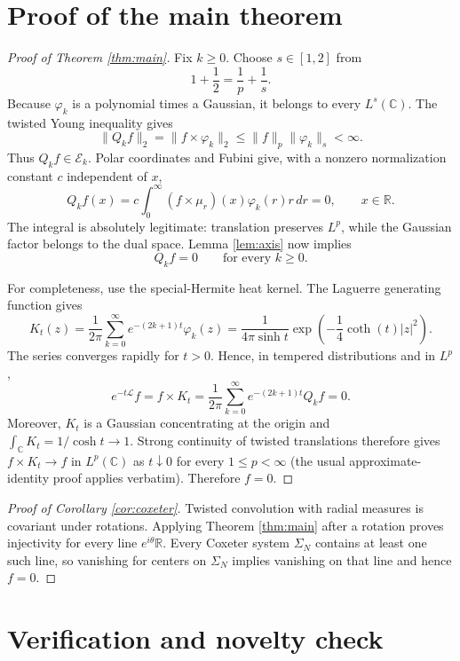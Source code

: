 \documentclass[11pt]{article}
\newcommand{\C}{\mathbb C}
\newcommand{\R}{\mathbb R}
\newcommand{\cE}{\mathcal E}
\newcommand{\dd}{\,d}
\begin{document}
\section*{Proof of the main theorem}

\begin{proof}[Proof of Theorem \ref{thm:main}]
Fix $k\ge0$.  Choose $s\in[1,2]$ from
\[
 1+\frac12=\frac1p+\frac1s.
\]
Because $\varphi_k$ is a polynomial times a Gaussian, it belongs to every
$L^s(\C)$.  The twisted Young inequality gives
\[
 \|Q_kf\|_2=\|f\times\varphi_k\|_2
 \le \|f\|_p\|\varphi_k\|_s<\infty.
\]
Thus $Q_kf\in\cE_k$.  Polar coordinates and Fubini give, with a nonzero
normalization constant $c$ independent of $x$,
\[
 Q_kf(x)=c\int_0^{\infty}
 (f\times\mu_r)(x)\varphi_k(r)r\dd r=0,
 \qquad x\in\R.
\]
The integral is absolutely legitimate: translation preserves $L^p$, while
the Gaussian factor belongs to the dual space.  Lemma \ref{lem:axis} now
implies
\[
 Q_kf=0\qquad\text{for every }k\ge0.
\]

For completeness, use the special-Hermite heat kernel.  The Laguerre
generating function gives
\[
 K_t(z)=\frac1{2\pi}\sum_{k=0}^{\infty}
 e^{-(2k+1)t}\varphi_k(z)
 =\frac{1}{4\pi\sinh t}
   \exp\!\left(-\frac14\coth(t)|z|^2\right).
\]
The series converges rapidly for $t>0$.  Hence, in tempered distributions
and in $L^p$,
\[
 e^{-t\mathcal L}f
 =f\times K_t
 =\frac1{2\pi}\sum_{k=0}^{\infty}e^{-(2k+1)t}Q_kf=0.
\]
Moreover, $K_t$ is a Gaussian concentrating at the origin and
$\int_{\C}K_t=1/\cosh t\to1$.  Strong continuity of twisted translations
therefore gives $f\times K_t\to f$ in $L^p(\C)$ as $t\downarrow0$ for every
$1\le p<\infty$ (the usual approximate-identity proof applies verbatim).
Therefore $f=0$.
\end{proof}

\begin{proof}[Proof of Corollary \ref{cor:coxeter}]
Twisted convolution with radial measures is covariant under rotations.
Applying Theorem \ref{thm:main} after a rotation proves injectivity for
every line $e^{i\theta}\R$.  Every Coxeter system $\Sigma_N$ contains at
least one such line, so vanishing for centers on $\Sigma_N$ implies vanishing
on that line and hence $f=0$.
\end{proof}

\section*{Verification and novelty check}
\end{document}
